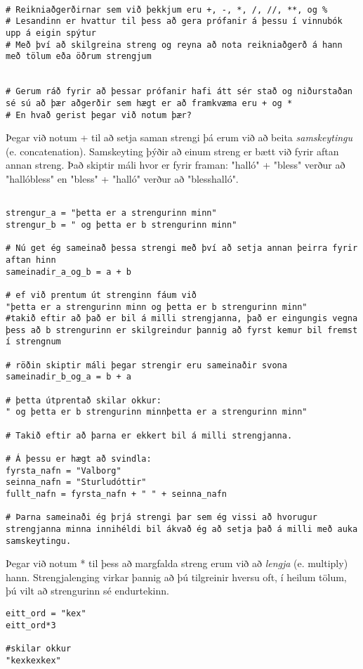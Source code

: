 
\begin{lstlisting}[caption="Strengir og reikniaðgerðir"]

# Reikniaðgerðirnar sem við þekkjum eru +, -, *, /, //, **, og %
# Lesandinn er hvattur til þess að gera prófanir á þessu í vinnubók upp á eigin spýtur
# Með því að skilgreina streng og reyna að nota reikniaðgerð á hann með tölum eða öðrum strengjum


# Gerum ráð fyrir að þessar prófanir hafi átt sér stað og niðurstaðan sé sú að þær aðgerðir sem hægt er að framkvæma eru + og *
# En hvað gerist þegar við notum þær?

\end{lstlisting}


Þegar við notum + til að setja saman strengi þá erum við að beita \textit{samskeytingu} (e. concatenation).
Samskeyting þýðir að einum streng er bætt við fyrir aftan annan streng.
Það skiptir máli hvor er fyrir framan: "halló" + "bless" verður að "hallóbless" en "bless" + "halló" verður að "blesshalló".

\begin{lstlisting}[caption="Samskeyting strengja"]

strengur_a = "þetta er a strengurinn minn"
strengur_b = " og þetta er b strengurinn minn"

# Nú get ég sameinað þessa strengi með því að setja annan þeirra fyrir aftan hinn
sameinadir_a_og_b = a + b

# ef við prentum út strenginn fáum við 
"þetta er a strengurinn minn og þetta er b strengurinn minn"
#takið eftir að það er bil á milli strengjanna, það er eingungis vegna þess að b strengurinn er skilgreindur þannig að fyrst kemur bil fremst í strengnum

# röðin skiptir máli þegar strengir eru sameinaðir svona
sameinadir_b_og_a = b + a

# þetta útprentað skilar okkur:
" og þetta er b strengurinn minnþetta er a strengurinn minn"

# Takið eftir að þarna er ekkert bil á milli strengjanna.

# Á þessu er hægt að svindla:
fyrsta_nafn = "Valborg"
seinna_nafn = "Sturludóttir"
fullt_nafn = fyrsta_nafn + " " + seinna_nafn

# Þarna sameinaði ég þrjá strengi þar sem ég vissi að hvorugur strengjanna minna innihéldi bil ákvað ég að setja það á milli með auka samskeytingu.
\end{lstlisting}

Þegar við notum * til þess að margfalda streng erum við að \textit{lengja} (e. multiply) hann.
Strengjalenging virkar þannig að þú tilgreinir hversu oft, í heilum tölum, þú vilt að strengurinn sé endurtekinn.

\begin{lstlisting}[caption="Strengjalenging"]
eitt_ord = "kex"
eitt_ord*3

#skilar okkur
"kexkexkex"
\end{lstlisting}